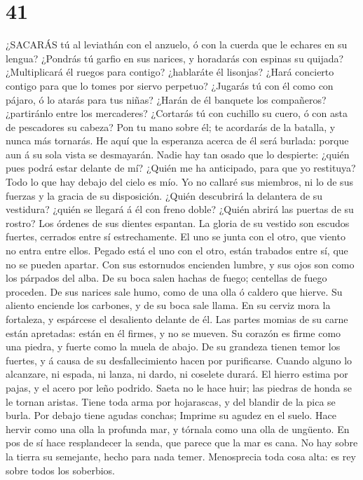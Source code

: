 \hypertarget{section-40}{%
\section{41}\label{section-40}}

 ¿SACARÁS tú al leviathán con el anzuelo, ó con la cuerda
que le echares en su lengua?  ¿Pondrás tú garfio en sus
narices, y horadarás con espinas su quijada?  ¿Multiplicará
él ruegos para contigo? ¿hablaráte él lisonjas?  ¿Hará
concierto contigo para que lo tomes por siervo perpetuo? 
¿Jugarás tú con él como con pájaro, ó lo atarás para tus niñas?
 ¿Harán de él banquete los compañeros? ¿partiránlo entre los
mercaderes?  ¿Cortarás tú con cuchillo su cuero, ó con asta
de pescadores su cabeza?  Pon tu mano sobre él; te acordarás
de la batalla, y nunca más tornarás.  He aquí que la
esperanza acerca de él será burlada: porque aun á su sola vista se
desmayarán.  Nadie hay tan osado que lo despierte: ¿quién
pues podrá estar delante de mí?  ¿Quién me ha anticipado,
para que yo restituya? Todo lo que hay debajo del cielo es mío.
 Yo no callaré sus miembros, ni lo de sus fuerzas y la
gracia de su disposición.  ¿Quién descubrirá la delantera
de su vestidura? ¿quién se llegará á él con freno doble? 
¿Quién abrirá las puertas de su rostro? Los órdenes de sus dientes
espantan.  La gloria de su vestido son escudos fuertes,
cerrados entre sí estrechamente.  El uno se junta con el
otro, que viento no entra entre ellos.  Pegado está el uno
con el otro, están trabados entre sí, que no se pueden apartar.
 Con sus estornudos encienden lumbre, y sus ojos son como
los párpados del alba.  De su boca salen hachas de fuego;
centellas de fuego proceden.  De sus narices sale humo,
como de una olla ó caldero que hierve.  Su aliento enciende
los carbones, y de su boca sale llama.  En su cerviz mora
la fortaleza, y espárcese el desaliento delante de él.  Las
partes momias de su carne están apretadas: están en él firmes, y no se
mueven.  Su corazón es firme como una piedra, y fuerte como
la muela de abajo.  De su grandeza tienen temor los
fuertes, y á causa de su desfallecimiento hacen por purificarse.
 Cuando alguno lo alcanzare, ni espada, ni lanza, ni dardo,
ni coselete durará.  El hierro estima por pajas, y el acero
por leño podrido.  Saeta no le hace huir; las piedras de
honda se le tornan aristas.  Tiene toda arma por
hojarascas, y del blandir de la pica se burla.  Por debajo
tiene agudas conchas; Imprime su agudez en el suelo.  Hace
hervir como una olla la profunda mar, y tórnala como una olla de
ungüento.  En pos de sí hace resplandecer la senda, que
parece que la mar es cana.  No hay sobre la tierra su
semejante, hecho para nada temer.  Menosprecia toda cosa
alta: es rey sobre todos los soberbios.

